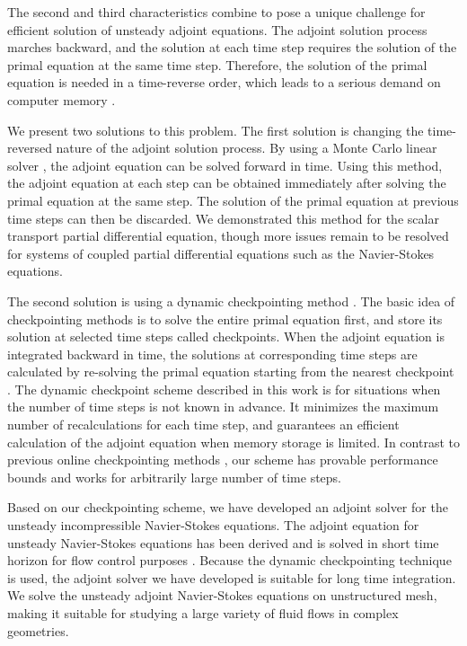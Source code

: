 The second and third characteristics combine to pose a unique challenge for
efficient solution of unsteady adjoint equations.  The adjoint
solution process marches backward, and the solution at each time step requires
the solution of the primal equation at the same time step.  Therefore, the
solution of the primal equation is needed in a time-reverse order,
which leads to a serious demand on computer memory \cite[]{griewank00}.

We present two solutions to this problem.  The first solution is
changing the time-reversed nature of the adjoint solution process.  By using
a Monte Carlo linear solver \cite[]{Srinivasan2003} \cite[]{Okten2005},
the adjoint equation can be solved forward in
time.  Using this method, the adjoint equation at each step can be obtained
immediately after solving the primal equation at the same step.
The solution
of the primal equation at previous time steps can then be discarded.
We demonstrated this method for the scalar transport partial differential
equation, though more issues remain to be resolved for systems of coupled
partial differential equations such as the Navier-Stokes equations.

The second solution is using a dynamic checkpointing method
\cite[]{charpentier2001}.  The basic idea
of checkpointing methods is to solve the entire primal equation first, and
store its solution at selected time steps called checkpoints.
When the adjoint
equation is integrated backward in time, the solutions at corresponding
time steps are
calculated by re-solving the primal equation starting from the nearest
checkpoint \cite[]{griewank00}.
The dynamic checkpoint scheme described in this work is
for situations when the number of time steps is not known in advance.
It minimizes
the maximum number of recalculations for each time step, and guarantees an
efficient calculation of the adjoint equation when memory storage is limited.
In contrast to previous online checkpointing methods \cite[]{heuveline2006}
\cite[]{andrea08} \cite[]{hinze2005}, our scheme has provable performance bounds
and works for arbitrarily large number of time steps.

Based on our checkpointing scheme, we have developed an adjoint solver for the
unsteady incompressible Navier-Stokes equations.
The adjoint equation for unsteady Navier-Stokes equations has been
derived and is solved in short time horizon for flow control purposes
\cite[]{bewley01} \cite[]{adjoint1}.
Because the dynamic checkpointing technique is used, the
adjoint solver we have developed is suitable for long time integration.
We solve the unsteady adjoint Navier-Stokes equations on unstructured mesh,
making it suitable for studying a large variety of fluid flows in complex
geometries.


